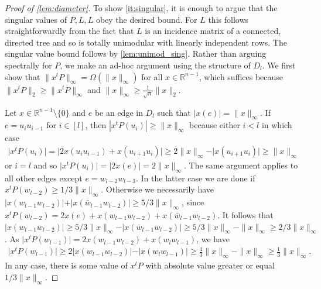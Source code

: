 \documentclass[10pt,a4paper]{article}
\numberwithin{equation}{section}
\newcommand{\RR}{\mathbb R}
\begin{document}
\begin{proof}[Proof of \cref{lem:diameter}]
To show \cref{it:singular}, it is enough to argue that the singular values of $P, L, L$ obey the desired bound. For $L$ this follows straightforwardly from the fact that $L$ is an incidence matrix of a connected, directed tree and so is totally unimodular with linearly independent rows. The singular value bound follows by \cref{lem:unimod_sing}. Rather than arguing spectrally for $P$, we make an ad-hoc argument using the structure of $D_l$.
We first show that $\|x^t P\|_\infty = \Omega( \|x\|_\infty)$ for all $x \in \RR^{n-1}$, which suffices because $\|x^t P\|_2 \geq  \|x^tP\|_\infty$ and $\|x\|_\infty \geq \frac{1}{\sqrt{n}}\|x\|_2$.

Let $x \in \RR^{n-1} \setminus \lbrace 0 \rbrace$ and $e$ be an edge in $D_l$ such that $\vert x(e) \vert  = \| x \|_\infty$. If $e = u_iu_{i-1}$ for $i \in [l]$, then $|x^t P (u_{i})| \geq \| x \|_\infty$ because either $i < l$ in which case
	\begin{align*}
	\vert x^t P (u_{i }) \vert = \vert 2 x(u_{i}u_{i - 1}) + x(u_{i+1}u_{i}) \vert \geq 2\|x\|_\infty - \vert x(u_{i+1}u_{i}) \vert \geq \|x\|_\infty
	\end{align*}
or $i = l$ and so $\vert x^t P (u_{i}) \vert = \vert 2 x(e) \vert = 2 \|x\|_\infty$. The same argument applies to all other edges except $e = w_{l-2} w_{l-3}$. In the latter case we are done if $x^t P (w_{l-2}) \geq 1/3 \| x \|_\infty$. Otherwise we necessarily have $\vert x(w_{l-1} w_{l-2}) \vert + \vert x(\bar{w}_{l-1} w_{l-2}) \vert \geq 5/3 \|x\|_\infty$, since $x^t P(w_{l-2}) = 2x(e) + x(w_{l-1} w_{l-2}) + x(\bar{w}_{l-1} w_{l-2})$. It follows that $\vert x(w_{l-1} w_{l-2}) \vert \geq 5/3 \|x\|_\infty - \vert x(\bar{w}_{l-1} w_{l-2}) \vert \geq 5/3 \|x\|_\infty - \|x\|_\infty \geq 2/3 \|x\|_\infty$. As $\vert x^t P(w_{l-1}) \vert = 2  x(w_{l-1} w_{l-2})+ x(w_l w_{l-1}) $, we have 
	\begin{align*}
	\vert x^t P(w_{l-1}) \vert \geq 2 \vert x(w_{l-1} w_{l-2}) \vert - \vert x(w_l w_{l-1}) \vert \geq \frac{4}{3} \|x\|_\infty - \|x\|_\infty \geq \frac{1}{3} \|x\|_\infty.
	\end{align*}
In any case, there is some value of $x^t P$ with absolute value greater or equal $1/3 \|x\|_\infty$. 



\end{proof}
\end{document}
